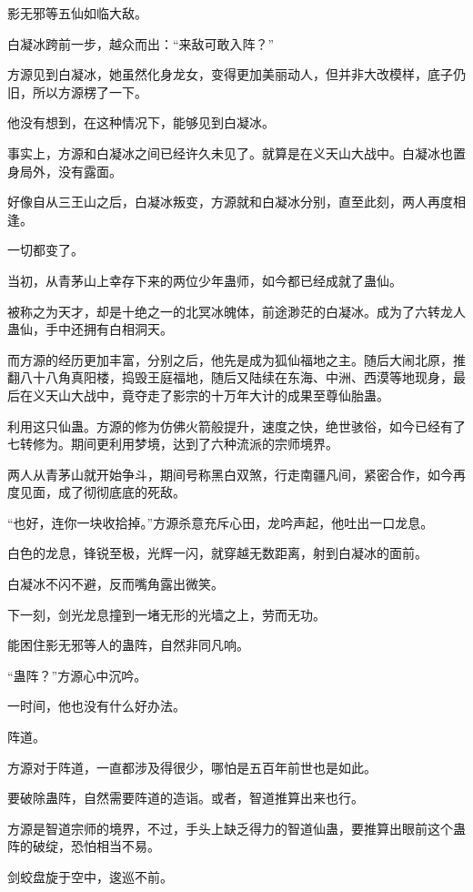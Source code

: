 \begin{this_body}
影无邪等五仙如临大敌。

白凝冰跨前一步，越众而出：“来敌可敢入阵？”

方源见到白凝冰，她虽然化身龙女，变得更加美丽动人，但并非大改模样，底子仍旧，所以方源楞了一下。

他没有想到，在这种情况下，能够见到白凝冰。

事实上，方源和白凝冰之间已经许久未见了。就算是在义天山大战中。白凝冰也置身局外，没有露面。

好像自从三王山之后，白凝冰叛变，方源就和白凝冰分别，直至此刻，两人再度相逢。

一切都变了。

当初，从青茅山上幸存下来的两位少年蛊师，如今都已经成就了蛊仙。

被称之为天才，却是十绝之一的北冥冰魄体，前途渺茫的白凝冰。成为了六转龙人蛊仙，手中还拥有白相洞天。

而方源的经历更加丰富，分别之后，他先是成为狐仙福地之主。随后大闹北原，推翻八十八角真阳楼，捣毁王庭福地，随后又陆续在东海、中洲、西漠等地现身，最后在义天山大战中，竟夺走了影宗的十万年大计的成果至尊仙胎蛊。

利用这只仙蛊。方源的修为仿佛火箭般提升，速度之快，绝世骇俗，如今已经有了七转修为。期间更利用梦境，达到了六种流派的宗师境界。

两人从青茅山就开始争斗，期间号称黑白双煞，行走南疆凡间，紧密合作，如今再度见面，成了彻彻底底的死敌。

“也好，连你一块收拾掉。”方源杀意充斥心田，龙吟声起，他吐出一口龙息。

白色的龙息，锋锐至极，光辉一闪，就穿越无数距离，射到白凝冰的面前。

白凝冰不闪不避，反而嘴角露出微笑。

下一刻，剑光龙息撞到一堵无形的光墙之上，劳而无功。

能困住影无邪等人的蛊阵，自然非同凡响。

“蛊阵？”方源心中沉吟。

一时间，他也没有什么好办法。

阵道。

方源对于阵道，一直都涉及得很少，哪怕是五百年前世也是如此。

要破除蛊阵，自然需要阵道的造诣。或者，智道推算出来也行。

方源是智道宗师的境界，不过，手头上缺乏得力的智道仙蛊，要推算出眼前这个蛊阵的破绽，恐怕相当不易。

剑蛟盘旋于空中，逡巡不前。


\end{this_body}
